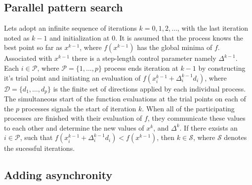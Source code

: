 \subsection{Parallel pattern search}

Lets adopt an infinite sequence of iterations $k=0,1,2,\dots$, with the last iteration noted as $k-1$ and initialization at $0$. It is assumed that the process knows the best point so far as $x^{k-1}$, where $f(x^{k-1})$ has the global minima of $f$. Associated with $x^{k-1}$ there is a step-length control parameter namely $\Delta^{k-1}$. Each $i\in\mathcal{P}$, where $\mathcal{P}=\{1,\dots,p\}$ process ends iteration at $k-1$ by constructing it's trial point and initiating an evaluation of $f(x^{k-1}_i+\Delta^{k-1}_id_i)$, where $\mathcal{D}=\{d_1,\dots,d_p\}$ is the finite set of directions applied by each individual process. The simultaneous start of the function evaluations at the trial points on each of the $p$ processes signals the start of iteration $k$. When all of the participating processes are finished with their evaluation of $f$, they communicate these values to each other and determine the new values of $x^k$, and $\Delta^k$. If there exsists an $i\in\mathcal{P}$, such that $f(x^{k-1}_i+\Delta^{k-1}_id_i)<f(x^{k-1})$, then $k\in\mathcal{S}$, where $\mathcal{S}$ denotes the sucessful iterations.

\subsection{Adding asynchronity}

